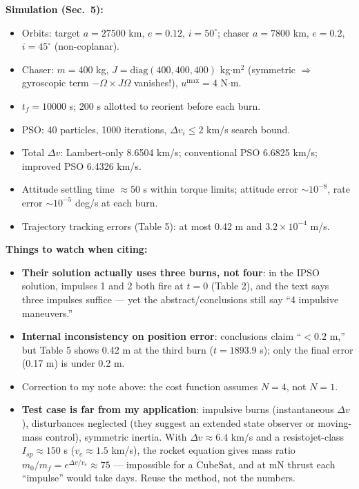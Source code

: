 \documentclass[11pt]{article}
\begin{document}
\textbf{Simulation (Sec.\ 5):}
\begin{itemize}[noitemsep]
    \item Orbits: target $a = 27500$ km, $e = 0.12$, $i = 50^\circ$; chaser $a = 7800$ km, $e = 0.2$, $i = 45^\circ$ (non-coplanar).
    \item Chaser: $m = 400$ kg, $J = \mathrm{diag}(400,400,400)$ kg$\cdot$m$^2$ (symmetric $\Rightarrow$ gyroscopic term $-\Omega \times J\Omega$ vanishes!), $u^{\max} = 4$ N$\cdot$m.
    \item $t_f = 10000$ s; 200 s allotted to reorient before each burn.
    \item PSO: 40 particles, 1000 iterations, $\Delta v_i \le 2$ km/s search bound.
    \item Total $\Delta v$: Lambert-only 8.6504 km/s; conventional PSO 6.6825 km/s; improved PSO 6.4326 km/s.
    \item Attitude settling time $\approx 50$ s within torque limits; attitude error $\sim 10^{-8}$, rate error $\sim 10^{-5}$ deg/s at each burn.
    \item Trajectory tracking errors (Table 5): at most 0.42 m and $3.2\times10^{-4}$ m/s.
\end{itemize}

\textbf{Things to watch when citing:}
\begin{itemize}[noitemsep]
    \item \textbf{Their solution actually uses three burns, not four}: in the IPSO solution, impulses 1 and 2 both fire at $t=0$ (Table 2), and the text says three impulses suffice --- yet the abstract/conclusions still say ``4 impulsive maneuvers.''
    \item \textbf{Internal inconsistency on position error}: conclusions claim ``$< 0.2$ m,'' but Table 5 shows 0.42 m at the third burn ($t = 1893.9$ s); only the final error (0.17 m) is under 0.2 m.
    \item Correction to my note above: the cost function assumes $N = 4$, not $N = 1$.
    \item \textbf{Test case is far from my application}: impulsive burns (instantaneous $\Delta v$), disturbances neglected (they suggest an extended state observer or moving-mass control), symmetric inertia. With $\Delta v \approx 6.4$ km/s and a resistojet-class $I_{sp} \approx 150$ s ($v_e \approx 1.5$ km/s), the rocket equation gives mass ratio $m_0/m_f = e^{\Delta v/v_e} \approx 75$ --- impossible for a CubeSat, and at mN thrust each ``impulse'' would take days. Reuse the method, not the numbers.
\end{itemize}
\end{document}
